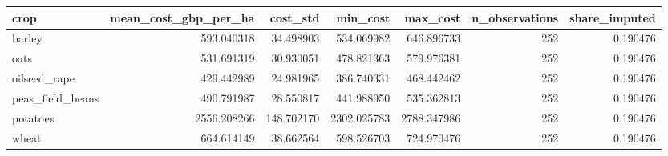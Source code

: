 \begin{tabular}{lrrrrrr}
\toprule
crop & mean\_cost\_gbp\_per\_ha & cost\_std & min\_cost & max\_cost & n\_observations & share\_imputed \\
\midrule
barley & 593.040318 & 34.498903 & 534.069982 & 646.896733 & 252 & 0.190476 \\
oats & 531.691319 & 30.930051 & 478.821363 & 579.976381 & 252 & 0.190476 \\
oilseed\_rape & 429.442989 & 24.981965 & 386.740331 & 468.442462 & 252 & 0.190476 \\
peas\_field\_beans & 490.791987 & 28.550817 & 441.988950 & 535.362813 & 252 & 0.190476 \\
potatoes & 2556.208266 & 148.702170 & 2302.025783 & 2788.347986 & 252 & 0.190476 \\
wheat & 664.614149 & 38.662564 & 598.526703 & 724.970476 & 252 & 0.190476 \\
\bottomrule
\end{tabular}
